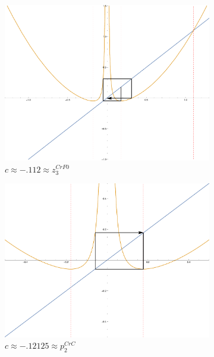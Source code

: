 \begin{figure}[ht]
		\begin{subfigure}[b]{0.3\textwidth}
				\includegraphics[width=\textwidth]{./img/plot-0112}
				\caption{$c \approx -.112 \approx z_3^{CrF0}$}
		\end{subfigure}
		\begin{subfigure}[b]{0.3\textwidth}
				\includegraphics[width=\textwidth]{./img/plot-012125}
				\caption{$c \approx - .12125 \approx p_2^{CrC}$}
		\end{subfigure}
		\begin{subfigure}[b]{0.3\textwidth}

\end{subfigure}
\end{figure}
